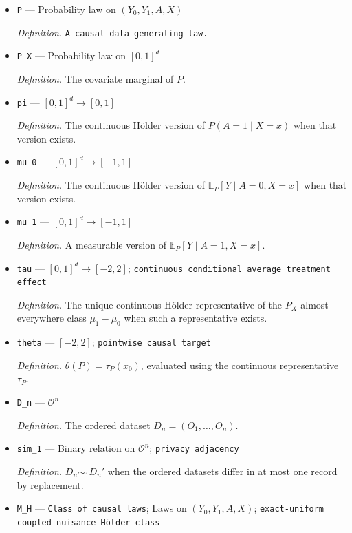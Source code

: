 \documentclass{article}
\begin{document}
\begin{itemize}
  \par\smallskip\noindent\emph{Definition.} One observed record \(O=(Y,A,X)\).
  \item \texttt{P} --- Probability law on \((Y_0,Y_1,A,X)\)
  \par\smallskip\noindent\emph{Definition.} \texttt{A causal data-\allowbreak{}generating law.}
  \item \texttt{P\_\allowbreak{}X} --- Probability law on \([0,1]^d\)
  \par\smallskip\noindent\emph{Definition.} The covariate marginal of \(P\).
  \item \texttt{pi} --- \([0,1]^d\to[0,1]\)
  \par\smallskip\noindent\emph{Definition.} The continuous Hölder version of \(P(A=1\mid X=x)\) when that version exists.
  \item \texttt{mu\_\allowbreak{}0} --- \([0,1]^d\to[-1,1]\)
  \par\smallskip\noindent\emph{Definition.} The continuous Hölder version of \(\mathbb E_P[Y\mid A=0,X=x]\) when that version exists.
  \item \texttt{mu\_\allowbreak{}1} --- \([0,1]^d\to[-1,1]\)
  \par\smallskip\noindent\emph{Definition.} A measurable version of \(\mathbb E_P[Y\mid A=1,X=x]\).
  \item \texttt{tau} --- \([0,1]^d\to[-2,2]\); \texttt{continuous conditional average treatment effect}
  \par\smallskip\noindent\emph{Definition.} The unique continuous Hölder representative of the \(P_X\)-almost-everywhere class \(\mu_1-\mu_0\) when such a representative exists.
  \item \texttt{theta} --- \([-2,2]\); \texttt{pointwise causal target}
  \par\smallskip\noindent\emph{Definition.} \(\theta(P)=\tau_P(x_0)\), evaluated using the continuous representative \(\tau_P\).
  \item \texttt{D\_\allowbreak{}n} --- \(\mathcal O^n\)
  \par\smallskip\noindent\emph{Definition.} The ordered dataset \(D_n=(O_1,\ldots,O_n)\).
  \item \texttt{sim\_\allowbreak{}1} --- Binary relation on \(\mathcal O^n\); \texttt{privacy adjacency}
  \par\smallskip\noindent\emph{Definition.} \(D_n\sim_1D_n'\) when the ordered datasets differ in at most one record by replacement.
  \item \texttt{M\_\allowbreak{}H} --- \texttt{Class of causal laws}; Laws on \((Y_0,Y_1,A,X)\); \texttt{exact-\allowbreak{}uniform coupled-\allowbreak{}nuisance Hölder class}

\end{itemize}
\end{document}
